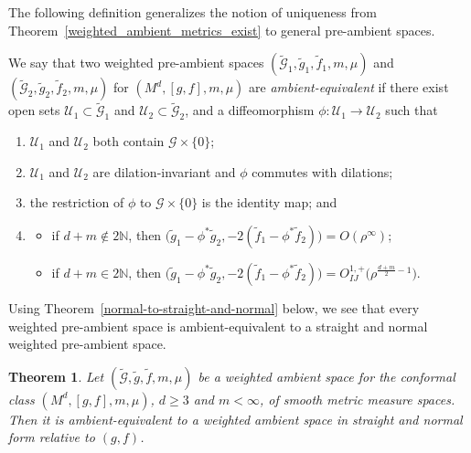 \documentclass[10pt,a4paper]{amsart}
\newcommand{\cg}{\widetilde{g}}
\newcommand{\cf}{\widetilde{f}}
\newcommand{\cmG}{\widetilde{\mathcal{G}}}
\numberwithin{equation}{section}
\newtheorem{Theorem}{Theorem}[section]
\begin{document}
The following definition generalizes the notion of uniqueness from Theorem~\ref{weighted_ambient_metrics_exist} to general pre-ambient spaces.

\begin{Definition}
{\sloppy
We say that two weighted pre-ambient spaces $(\widetilde{\mathcal{G}}_{1}, \widetilde{g}_{1},\widetilde{f}_1,m,\mu)$ and $(\widetilde{\mathcal{G}}_{2}, \widetilde{g}_{2}, \widetilde{f}_2,\allowbreak m,\mu)$ for $(M^d,[g,f],m,\mu)$ are \emph{ambient-equivalent} if there exist open sets $\mathcal{U}_{1} \subset \widetilde{\mathcal{G}}_{1}$ and $\mathcal{U}_{2} \subset \widetilde{\mathcal{G}}_{2}$, and a diffeomorphism $\phi\colon \mathcal{U}_{1} \rightarrow \mathcal{U}_{2}$ such that}
\begin{enumerate}[label=$(\roman*)$]\itemsep=0pt
\item $\mathcal{U}_{1}$ and $\mathcal{U}_{2}$ both contain $\mathcal{G} \times\{0\}$;

\item $\mathcal{U}_{1}$ and $\mathcal{U}_{2}$ are dilation-invariant and $\phi$ commutes with dilations;

\item the restriction of $\phi$ to $\mathcal{G} \times\{0\}$ is the identity map; and

\item \begin{itemize}
\item[$(a)$] if $d+m\notin 2\mathbb{N}$, then $\big(\widetilde{g}_{1}-\phi^{*} \widetilde{g}_{2}, -2(\widetilde{f}_1-\phi^*\widetilde{f}_2)\big)=O(\rho^\infty)$;
\item[$(b)$] if $d+m\in 2\mathbb{N}$, then $\big(\widetilde{g}_{1}-\phi^{*} \widetilde{g}_{2}, -2(\widetilde{f}_1-\phi^*\widetilde{f}_2)\big)=O_{I J}^{1,+}\big(\rho^{\frac{d+m}{2}-1}\big)$.
\end{itemize}
\end{enumerate}
\end{Definition}

Using Theorem~\ref{normal-to-straight-and-normal} below, we see that every weighted pre-ambient space is ambient-equivalent to a straight and normal weighted pre-ambient space.

{\sloppy\begin{Theorem}\label{pullback-normal}
Let $(\cmG,\cg,\cf,m,\mu)$ be a weighted ambient space for the conformal class $(M^d,[g,f],m,\mu)$, $d \geq 3$ and $m<\infty$, of smooth metric measure spaces. Then it is ambient-equivalent to a weighted ambient space in straight and normal form relative to $(g,f)$.
\end{Theorem}}
\end{document}
